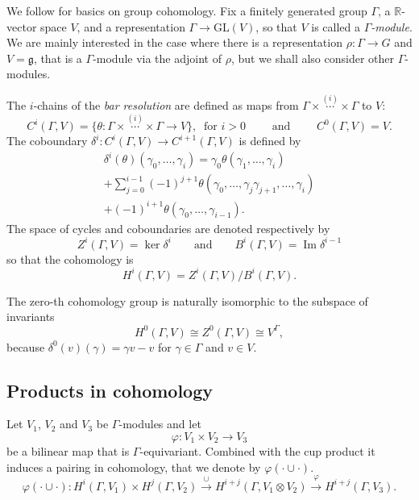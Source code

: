 \documentclass[a4paper,11pt]{article}
\begin{document}
We follow \cite{Brown} for basics on group cohomology.
% 
Fix a finitely generated group $\Gamma$, a $\mathbb R$-vector space $V$, and a representation
$\Gamma\to\mathrm{GL}(V)$, so that $V$ is called a \emph{$\Gamma$-module}.
We are mainly interested in the case where there is a representation 
$\rho\colon\Gamma\to G$ and $V=\mathfrak g$, that is a $\Gamma$-module via the adjoint of $\rho$,
but we shall also consider other $\Gamma$-modules. 

The $i$-chains of the  \emph{bar resolution} are defined as maps from 
$\Gamma\times\overset{(i)}\cdots\times \Gamma$ to $V$:
$$
C^i(\Gamma,V)= \{\theta\colon \Gamma\times\overset{(i)}\cdots\times \Gamma\to V\},
\ \textrm{ for }i>0
\qquad\textrm{ and }\qquad C^0(\Gamma,V)=V.
$$
The coboundary $\delta^i\colon C^i(\Gamma,V)\to C^{i+1}(\Gamma,V)$ is defined by
\begin{multline*}
\delta^i(\theta)(\gamma_0,\ldots,\gamma_{i})
=\gamma_0\theta(\gamma_1,\ldots,\gamma_i)
\\
+
\sum_{j=0}^{i-1}(-1)^{j+1} \theta(\gamma_0,\ldots, \gamma_j\gamma_{j+1},\ldots, \gamma_i)
\\
+(-1)^{i+1}\theta(\gamma_0,\ldots, \gamma_{i-1}) . 
\end{multline*}
The space of cycles and coboundaries are denoted respectively by
$$
Z^i(\Gamma, V)=\ker \delta^i  \qquad \textrm{and}\qquad
B^i(\Gamma, V)=\operatorname{Im} \delta^{i-1} 
$$
so that the cohomology is $$
H^i(\Gamma, V)= Z^i(\Gamma, V)/ B^i(\Gamma, V).
$$

The zero-th cohomology group is naturally isomorphic to the subspace of invariants 
\begin{equation}
 \label{eqn:H0}
H^0(\Gamma, V)\cong Z^0(\Gamma, V)\cong V^{\Gamma},
\end{equation}
because $\delta^0(v)(\gamma)= \gamma v-v$ for $\gamma\in\Gamma$ and $v\in V$.




\subsection{Products in cohomology}

 Let $V_1$, $V_2$ and $V_3$ be $\Gamma$-modules and 
let 
$$
\varphi\colon V_1\times V_2\to V_3
$$ be a bilinear map that is $\Gamma$-equivariant. 
Combined with the cup product it induces a pairing
in cohomology, that we denote by $\varphi(\cdot\cup\cdot)$.
$$ \varphi(\cdot\cup\cdot)\colon
 H^i(\Gamma, V_1)\times 
 H^{j}(\Gamma,  V_2)\overset\cup\to 
 H^{i+j}(\Gamma,  V_1\otimes V_2 )\overset\varphi\to 
 H^{i+j}(\Gamma, V_3).
 $$
\end{document}
